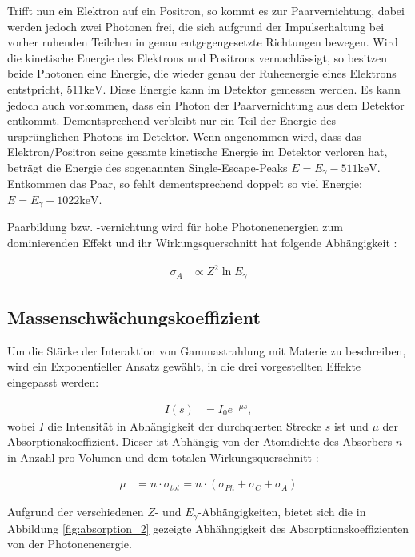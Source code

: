 \documentclass[
	parskip=half,10pt,
	numbers= noenddot, %
	toc=flat, %
	oneside,
	twocolumn,
	]{scrartcl}
\begin{document}
Trifft nun ein Elektron auf ein Positron, so kommt es zur Paarvernichtung, dabei werden jedoch zwei Photonen frei, die sich aufgrund der Impulserhaltung bei vorher 
ruhenden Teilchen in genau entgegengesetzte Richtungen bewegen. 
Wird die kinetische Energie des Elektrons und Positrons vernachlässigt, so besitzen beide Photonen eine Energie, 
die wieder genau der Ruheenergie eines Elektrons entstpricht, $511 \si{\kilo \electronvolt}$. Diese Energie kann im Detektor gemessen werden. Es kann jedoch auch 
vorkommen, dass ein Photon der Paarvernichtung aus dem Detektor entkommt. Dementsprechend verbleibt nur ein Teil der Energie des ursprünglichen 
Photons im Detektor. Wenn angenommen wird, dass das Elektron/Positron seine gesamte kinetische Energie im Detektor verloren hat, beträgt die Energie des 
sogenannten Single-Escape-Peaks $E = E_{\gamma} - 511 \si{\kilo \electronvolt}$. Entkommen das Paar, so fehlt dementsprechend doppelt so viel Energie: 
$E = E_{\gamma} - 1022 \si{\kilo \electronvolt}$. 

Paarbildung bzw. -vernichtung wird für hohe Photonenenergien zum dominierenden Effekt und ihr Wirkungsquerschnitt hat folgende Abhängigkeit \cite{harvey}:

\begin{align}
\sigma_A &\propto Z^2 \ln E_{\gamma}
\end{align}  


\subsection{Massenschwächungskoeffizient}

Um die Stärke der Interaktion von Gammastrahlung mit Materie zu beschreiben, wird ein Exponentieller Ansatz gewählt, in die drei vorgestellten Effekte eingepasst 
werden:

\begin{align}
I(s) &= I_0 e^{- \mu s},
\end{align}
wobei $I$ die Intensität in Abhängigkeit der durchquerten Strecke $s$ ist und $\mu$ der Absorptionskoeffizient. Dieser ist Abhängig von der Atomdichte des Absorbers $n$ 
in Anzahl pro Volumen und dem totalen Wirkungsquerschnitt \cite{marmier}:

\begin{align}
\mu &= n \cdot \sigma_{tot} = n \cdot ( \sigma_{Ph} + \sigma_C + \sigma_A)
\end{align}

Aufgrund der verschiedenen $Z$- und $E_{\gamma}$-Abhängigkeiten, bietet sich die in Abbildung \ref{fig:absorption_2} gezeigte Abhähngigkeit des Absorptionskoeffizienten 
von der Photonenenergie.
\end{document}
